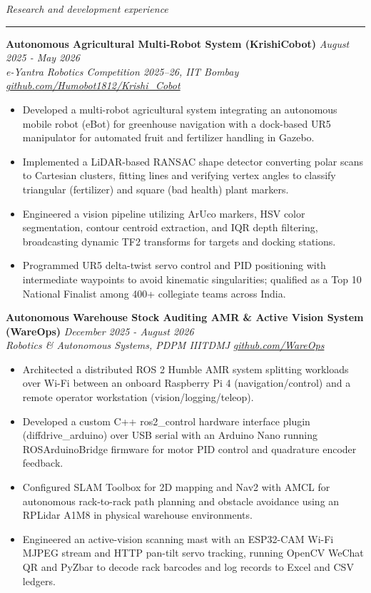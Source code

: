 \documentclass[10pt,a4paper]{article}
\newcommand{\cvsection}[1]{%
  \vspace{7pt}%
  {\color{cvblue}\itshape\large #1}\\[-4pt]%
  {\color{cvblue}\rule{\textwidth}{0.75pt}}\vspace{3pt}%
}
\begin{document}
\cvsection{Research and development experience}

\textbf{Autonomous Agricultural Multi-Robot System (KrishiCobot)} \hfill \textit{August 2025 - May 2026}\\
\textit{e-Yantra Robotics Competition 2025–26, IIT Bombay} \hfill \textit{\href{https://github.com/Humobot1812/Krishi_Cobot}{github.com/Humobot1812/Krishi\_Cobot}}
\begin{itemize}[leftmargin=1.2rem,itemsep=1.5pt,topsep=2pt,parsep=0pt]
  \item Developed a multi-robot agricultural system integrating an autonomous mobile robot (eBot) for greenhouse navigation with a dock-based UR5 manipulator for automated fruit and fertilizer handling in Gazebo.
  \item Implemented a LiDAR-based RANSAC shape detector converting polar scans to Cartesian clusters, fitting lines and verifying vertex angles to classify triangular (fertilizer) and square (bad health) plant markers.
  \item Engineered a vision pipeline utilizing ArUco markers, HSV color segmentation, contour centroid extraction, and IQR depth filtering, broadcasting dynamic TF2 transforms for targets and docking stations.
  \item Programmed UR5 delta-twist servo control and PID positioning with intermediate waypoints to avoid kinematic singularities; qualified as a Top 10 National Finalist among 400+ collegiate teams across India.
\end{itemize}

\vspace{3pt}
\textbf{Autonomous Warehouse Stock Auditing AMR \& Active Vision System (WareOps)} \hfill \textit{December 2025 - August 2026}\\
\textit{Robotics \& Autonomous Systems, PDPM IIITDMJ} \hfill \textit{\href{https://github.com/WareOps}{github.com/WareOps}}
\begin{itemize}[leftmargin=1.2rem,itemsep=1.5pt,topsep=2pt,parsep=0pt]
  \item Architected a distributed ROS 2 Humble AMR system splitting workloads over Wi-Fi between an onboard Raspberry Pi 4 (navigation/control) and a remote operator workstation (vision/logging/teleop).
  \item Developed a custom C++ ros2\_control hardware interface plugin (diffdrive\_arduino) over USB serial with an Arduino Nano running ROSArduinoBridge firmware for motor PID control and quadrature encoder feedback.
  \item Configured SLAM Toolbox for 2D mapping and Nav2 with AMCL for autonomous rack-to-rack path planning and obstacle avoidance using an RPLidar A1M8 in physical warehouse environments.
  \item Engineered an active-vision scanning mast with an ESP32-CAM Wi-Fi MJPEG stream and HTTP pan-tilt servo tracking, running OpenCV WeChat QR and PyZbar to decode rack barcodes and log records to Excel and CSV ledgers.
\end{itemize}
\end{document}
